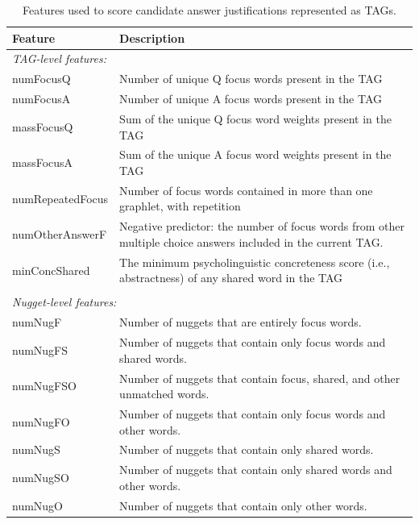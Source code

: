 \begin{table}[]
\caption{{  Features used to score candidate answer justifications represented as TAGs. }} 
\footnotesize{
\begin{tabular}{p{35mm}p{105mm}}
\hline
Feature & Description \\
\hline
\multicolumn{2}{l}{\emph{TAG-level features:}} \\
numFocusQ			&	Number of unique Q focus words present in the TAG						\\
numFocusA			&	Number of unique A focus words present in the TAG						\\
massFocusQ			&	Sum of the unique Q focus word weights present in the TAG				\\
massFocusA			&	Sum of the unique A focus word weights present in the TAG				\\
numRepeatedFocus	&	Number of focus words contained in more than one graphlet, with repetition \\
numOtherAnswerF		&	Negative predictor: the number of focus words from other multiple choice answers included in the current TAG.	\\
minConcShared		&	The minimum psycholinguistic concreteness score (i.e., abstractness) of any shared word in the TAG \\
\\
\multicolumn{2}{l}{\emph{Nugget-level features: }} \\
numNugF				&	Number of nuggets that are entirely focus words. \\
numNugFS 			&	Number of nuggets that contain only focus words and shared words. \\
numNugFSO			&	Number of nuggets that contain focus, shared, and other unmatched words. \\
numNugFO			&	Number of nuggets that contain only focus words and other words. \\
numNugS				&	Number of nuggets that contain only shared words. \\
numNugSO			&	Number of nuggets that contain only shared words and other words. \\
numNugO				&	Number of nuggets that contain only other words. \\

\end{tabular}}
\end{table}

